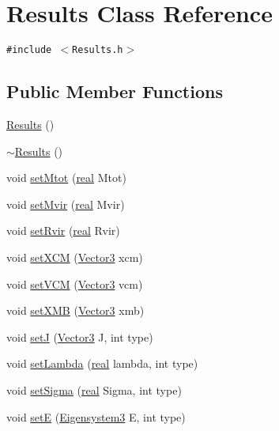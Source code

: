 \hypertarget{classResults}{
\section{Results Class Reference}
\label{classResults}
}
{\tt \#include $<$Results.h$>$}

\subsection*{Public Member Functions}
\begin{CompactItemize}
\item 
\hyperlink{classResults_e15a9e843b67c54e98a6f59a56104e1f}{Results} ()
\item 
\hyperlink{classResults_0547c32c2061192a72cad9db694ffb16}{$\sim$Results} ()
\item 
void \hyperlink{classResults_aa642ad38f7cf840df56a5a270776272}{setMtot} (\hyperlink{Global_8h_031f8951175b43076c2084a6c2173410}{real} Mtot)
\item 
void \hyperlink{classResults_ff53f5aede365e0602c67eb6cab157be}{setMvir} (\hyperlink{Global_8h_031f8951175b43076c2084a6c2173410}{real} Mvir)
\item 
void \hyperlink{classResults_0e950675675a46df23e238e6bc70fa09}{setRvir} (\hyperlink{Global_8h_031f8951175b43076c2084a6c2173410}{real} Rvir)
\item 
void \hyperlink{classResults_32b4389a4ddfa7f71123083f3532d732}{setXCM} (\hyperlink{classVector3}{Vector3} xcm)
\item 
void \hyperlink{classResults_f57d334517edbff666eb9cface25b224}{setVCM} (\hyperlink{classVector3}{Vector3} vcm)
\item 
void \hyperlink{classResults_d18101cd15bb458c403ead401e32d901}{setXMB} (\hyperlink{classVector3}{Vector3} xmb)
\item 
void \hyperlink{classResults_7c4269e38a488f47f99072fb1c4933e6}{setJ} (\hyperlink{classVector3}{Vector3} J, int type)
\item 
void \hyperlink{classResults_5f0e53eed7fbf0b2e9863a04eebce630}{setLambda} (\hyperlink{Global_8h_031f8951175b43076c2084a6c2173410}{real} lambda, int type)
\item 
void \hyperlink{classResults_9bafe25181646a2b141504ba32c8596f}{setSigma} (\hyperlink{Global_8h_031f8951175b43076c2084a6c2173410}{real} Sigma, int type)
\item 
void \hyperlink{classResults_69d3ed203d7eda44c0fcc06d4ea88257}{setE} (\hyperlink{classEigensystem3}{Eigensystem3} E, int type)
\end{CompactItemize}


